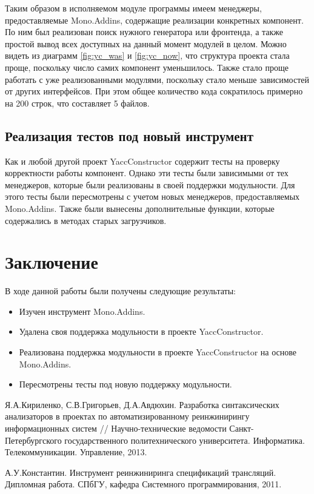 Таким образом в исполняемом модуле программы имеем менеджеры, предоставляемые Mono.Addins, содержащие реализации конкретных компонент. По ним был реализован поиск нужного генератора или фронтенда, а также простой вывод всех доступных на данный момент модулей в целом. Можно видеть из диаграмм \ref{fig:yc_was} и \ref{fig:yc_now}, что структура проекта стала проще, поскольку число самих компонент уменьшилось. Также стало проще работать с уже реализованными  модулями, поскольку стало меньше зависимостей от других интерфейсов.
При этом общее количество кода сократилось примерно на 200 строк, что составляет 5 файлов.

\subsection {Реализация тестов под новый инструмент}

Как и любой другой проект YaccConstructor содержит тесты на проверку корректности работы компонент.
Однако эти тесты были зависимыми от тех менеджеров, которые были реализованы в своей поддержки модульности. Для этого тесты были пересмотрены с учетом новых менеджеров, предоставляемых Mono.Addins. Также были вынесены дополнительные функции, которые содержались в методах старых загрузчиков.


\section*{Заключение}
В ходе данной работы были получены следующие результаты:
\begin{itemize}
\item Изучен инструмент Mono.Addins.
\item Удалена своя поддержка модульности в проекте  YaccConstructor.
\item Реализована поддержка модульности в проекте YaccConstructor на основе Mono.Addins.
\item Пересмотрены тесты под новую поддержку модульности.
\end{itemize}

\begin{thebibliography}{99}
Я.А.Кириленко, С.В.Григорьев, Д.А.Авдюхин. 
Разработка синтаксических анализаторов в проектах по автоматизированному реинжинирингу информационных систем //
Научно-технические ведомости Санкт-Петербургского государственного политехнического университета. Информатика. Телекоммуникации. Управление,
2013.

А.У.Константин. Инструмент реинжиниринга спецификаций трансляций.
Дипломная работа. СПбГУ, кафедра Системного программирования, 2011.
\end{thebibliography}
